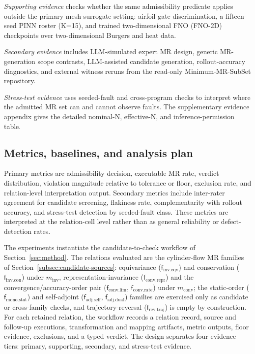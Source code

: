 \documentclass[preprint,12pt,authoryear]{elsarticle}
\providecommand{\minv}{m_{\mathrm{inv}}}
\providecommand{\mconv}{m_{\mathrm{conv}}}
\providecommand{\fIeqv}{\mathsf{f}_{\mathrm{inv}.\mathrm{eqv}}}
\providecommand{\fIcon}{\mathsf{f}_{\mathrm{inv}.\mathrm{con}}}
\providecommand{\fAself}{\mathsf{f}_{\mathrm{adj}.\mathrm{self}}}
\providecommand{\fAdual}{\mathsf{f}_{\mathrm{adj}.\mathrm{dual}}}
\providecommand{\fRtraj}{\mathsf{f}_{\mathrm{rev}.\mathrm{traj}}}
\providecommand{\fMstat}{\mathsf{f}_{\mathrm{mono}.\mathrm{stat}}}
\providecommand{\fClim}{\mathsf{f}_{\mathrm{conv}.\mathrm{lim}}}
\providecommand{\fCrate}{\mathsf{f}_{\mathrm{conv}.\mathrm{rate}}}
\providecommand{\fCrepr}{\mathsf{f}_{\mathrm{conv}.\mathrm{repr}}}
\begin{document}
\emph{Supporting evidence} checks whether the same admissibility predicate applies outside the primary mesh-surrogate setting: airfoil gate discrimination, a fifteen-seed PINN roster (K=15), and trained two-dimensional FNO (FNO-2D) checkpoints over two-dimensional Burgers and heat data.

\emph{Secondary evidence} includes LLM-simulated expert MR design, generic MR-generation scope contrasts, LLM-assisted candidate generation, rollout-accuracy diagnostics, and external witness reruns from the read-only Minimum-MR-SubSet repository.

\emph{Stress-test evidence} uses seeded-fault and cross-program checks to interpret where the admitted MR set can and cannot observe faults. The supplementary evidence appendix gives the detailed nominal-N, effective-N, and inference-permission table.

\subsection{Metrics, baselines, and analysis plan}
\label{subsec:metrics}
\label{subsec:experimental-method}
\label{subsec:baselines}
\label{subsec:rq-evidence}

Primary metrics are admissibility decision, executable MR rate, verdict distribution, violation magnitude relative to tolerance or floor, exclusion rate, and relation-level interpretation output. Secondary metrics include inter-rater agreement for candidate screening, flakiness rate, complementarity with rollout accuracy, and stress-test detection by seeded-fault class. These metrics are interpreted at the relation-cell level rather than as general reliability or defect-detection rates.

The experiments instantiate the candidate-to-check workflow of Section~\ref{sec:method}. The relations evaluated are the cylinder-flow MR families of Section~\ref{subsec:candidate-sources}: equivariance ($\fIeqv$) and conservation ($\fIcon$) under $\minv$, representation-invariance ($\fCrepr$) and the convergence/accuracy-order pair ($\fClim$, $\fCrate$) under $\mconv$; the static-order ($\fMstat$) and self-adjoint ($\fAself$, $\fAdual$) families are exercised only as candidate or cross-family checks, and trajectory-reversal ($\fRtraj$) is empty by construction. For each retained relation, the workflow records a relation record, source and follow-up executions, transformation and mapping artifacts, metric outputs, floor evidence, exclusions, and a typed verdict. The design separates four evidence tiers: primary, supporting, secondary, and stress-test evidence.
\end{document}

